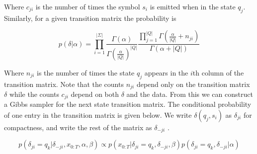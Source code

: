 \documentclass[11pt]{article}
\begin{document}
 Where $c_{ji}$ is the number of times the symbol $s_i$ is emitted when in the state $q_j$.  Similarly, for a given transition matrix the probability is
 
 \[ p(\delta|\alpha) = \prod_{i=1}^{|\Sigma|} \frac{\Gamma(\alpha)}{\Gamma(\frac{\alpha}{|Q|})^{|Q|}} \frac{\prod_{j=1}^{|Q|}\Gamma(\frac{\alpha}{|Q|} + n_{ji})}{\Gamma(\alpha + |Q|)} \]
 
 Where $n_{ji}$ is the number of times the state $q_j$ appears in the $i$th column of the transition matrix.  Note that the counts $n_{ji}$ depend only on the transition matrix $\delta$ while the counts $c_{ji}$ depend on both $\delta$ and the data.  From this we can construct a Gibbs sampler for the next state transition matrix.  The conditional probability of one entry in the transition matrix is given below.  We write $\delta(q_j,s_i)$ as $\delta_{ji}$ for compactness, and write the rest of the matrix as $\delta_{-ji}$ .
 
 \[ p(\delta_{ji} = q_k | \delta_{-ji},x_{0:T},\alpha,\beta) \propto p(x_{0:T}|\delta_{ji}=q_k,\delta_{-ji},\beta) p(\delta_{ji}=q_k,\delta_{-ji}|\alpha) \]


\end{document}
